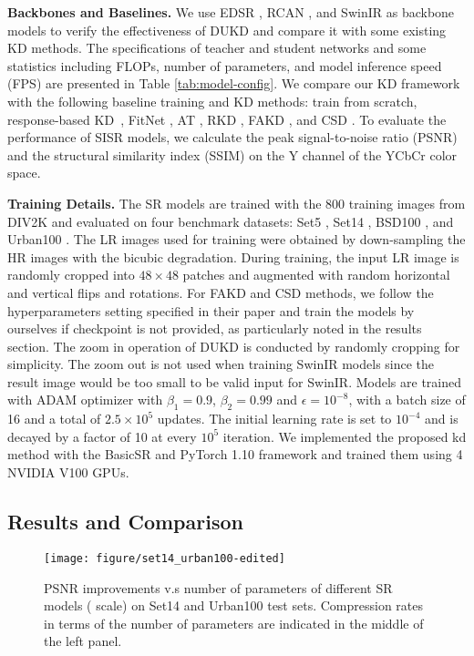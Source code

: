 \documentclass[10pt,twocolumn,letterpaper]{article}
\begin{document}
\textbf{Backbones and Baselines.} We use EDSR \cite{lim2017enhanced}, RCAN \cite{zhang2018image}, and SwinIR \cite{liang2021swinir} as backbone models to verify the effectiveness of DUKD and compare it with some existing KD methods. The specifications of teacher and student networks and some statistics including FLOPs, number of parameters, and model inference speed (FPS) are presented in Table \ref{tab:model-config}. We compare our KD framework with the following baseline training and KD methods: train from scratch, response-based KD~\cite{hinton2015distilling}, FitNet \cite{romero2014fitnets}, AT \cite{zagoruyko2016paying}, RKD \cite{park2019relational}, FAKD \cite{he2020fakd}, and CSD \cite{wang2021towards}. To evaluate the performance of SISR models, we calculate the peak signal-to-noise ratio (PSNR) and the structural similarity index (SSIM) on the Y channel of the YCbCr color space.

\noindent\textbf{Training Details.} The SR models are trained with the 800 training images from DIV2K \cite{timofte2017ntire} and evaluated on four benchmark datasets: Set5 \cite{bevilacqua2012low}, Set14 \cite{zeyde2012single}, BSD100 \cite{martin2001database}, and Urban100 \cite{huang2015single}. The LR images used for training were obtained by down-sampling the HR images with the bicubic degradation. During training, the input LR image is randomly cropped into $48\times48$ patches and augmented with random horizontal and vertical flips and rotations. For FAKD and CSD methods, we follow the hyperparameters setting specified in their paper and train the models by ourselves if checkpoint is not provided, as particularly noted in the results section. The zoom in operation of DUKD is conducted by randomly cropping for simplicity. The zoom out is not used when training SwinIR models since the result image would be too small to be valid input for SwinIR. Models are trained with ADAM optimizer \cite{kingma2014adam} with $\beta_1 = 0.9$, $\beta_2 = 0.99$ and $\epsilon = 10^{-8}$, with a batch size of 16 and a total of $2.5\times 10^{5}$ updates. The initial learning rate is set to $10^{-4}$ and is decayed by a factor of 10 at every $10^{5}$ iteration. We implemented the proposed kd method with the BasicSR \cite{basicsr} and PyTorch 1.10 framework and trained them using 4 NVIDIA V100 GPUs.

\subsection{Results and Comparison}\label{sec: exp-results}
\begin{figure}[h]
	\centering
	\texttt{[image: figure/set14\_urban100-edited]}\vspace{-0.5em}
	\caption{PSNR improvements v.s number of parameters of different SR models ( scale) on Set14 and Urban100 test sets. Compression rates in terms of the number of parameters are indicated in the middle of the left panel.}
	\label{fig:psnr-improvement}\vspace{-0.5em}
\end{figure}
\end{document}
